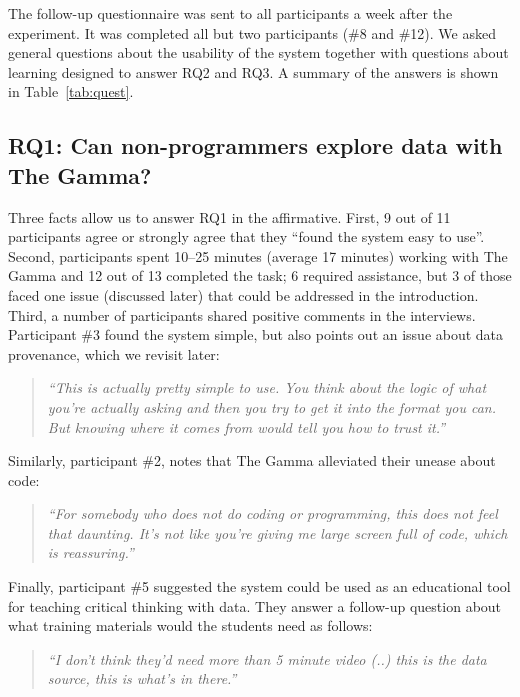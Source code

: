 \documentclass[manuscript,review,anonymous]{acmart}
\begin{document}
The follow-up questionnaire was sent to all participants a week after the experiment. It was
completed all but two participants (\#8 and \#12). We asked general questions about the usability
of the system together with questions about learning designed to answer RQ2 and RQ3. A summary
of the answers is shown in Table~\ref{tab:quest}.

\subsection*{RQ1: Can non-programmers explore data with The Gamma?}
Three facts allow us to answer RQ1 in the affirmative. First, 9 out of 11 participants agree or
strongly agree that they ``found the system easy to use''. Second, participants spent 10--25 minutes
(average 17 minutes) working with The Gamma and 12 out of 13 completed the task; 6 required assistance,
but 3 of those faced one issue (discussed later) that could be addressed in the introduction.
Third, a number of participants shared positive comments in the interviews.
Participant \#3 found the system simple, but also points out an issue about data provenance,
which we revisit later:

\begin{quote}
\emph{``This is actually pretty simple to use. You think about the logic of what you're actually
  asking and then you try to get it into the format you can. But knowing where it comes from
  would tell you how to trust it.''}
\end{quote}

\noindent
Similarly, participant \#2, notes that The Gamma alleviated their unease about code:

\begin{quote}
\emph{``For somebody who does not do coding or programming, this does not feel that daunting.
  It's not like you're giving me large screen full of code, which is reassuring.''}
\end{quote}

\noindent
Finally, participant \#5 suggested the system could be used as an educational tool for teaching
critical thinking with data. They answer a follow-up question about what training materials would
the students need as follows:

\begin{quote}
\emph{``I don't think they'd need more than 5 minute video (..) this is the data
  source, this is what's in there.''}
\end{quote}
\end{document}
